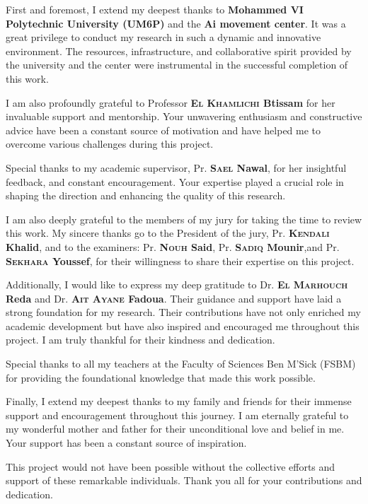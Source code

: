 First and foremost, I extend my deepest thanks to \textbf{Mohammed VI Polytechnic University (UM6P)} and the \textbf{Ai movement center}. It was a great privilege to conduct my research in such a dynamic and innovative environment. The resources, infrastructure, and collaborative spirit provided by the university and the center were instrumental in the successful completion of this work.
\medskip

I am also profoundly grateful to Professor \textbf{\textsc{ El Khamlichi} Btissam } for her invaluable support and mentorship. Your unwavering enthusiasm and constructive advice have been a constant source of motivation and have helped me to overcome various challenges during this project.
\medskip

Special thanks to my academic supervisor, Pr. \textbf{\textsc{Sael} Nawal}, for her insightful feedback, and constant encouragement. Your expertise played a crucial role in shaping the direction and enhancing the quality of this research.
\medskip

I am also deeply grateful to the members of my jury for taking the time to review this work. My sincere thanks go to the President of the jury, Pr. \textbf{\textsc{Kendali} Khalid}, and to the examiners: Pr. \textbf{\textsc{Nouh} Said}, Pr. \textbf{\textsc{Sadiq} Mounir},and  Pr. \textbf{\textsc{Sekhara} Youssef}, for their willingness to share their expertise on this project.
\medskip

Additionally, I would like to express my deep gratitude to Dr. \textbf{\textsc{El Marhouch} Reda } and Dr. \textbf{\textsc{Ait Ayane} Fadoua}. Their guidance and support have laid a strong foundation for my research. Their contributions have not only enriched my academic development but have also inspired and encouraged me throughout this project. I am truly thankful for their kindness and dedication.
\medskip



Special thanks to all my teachers at the Faculty of Sciences Ben M'Sick (FSBM) for providing the foundational knowledge that made this work possible.
\medskip


Finally, I extend my deepest thanks to my family and friends for their immense support and encouragement throughout this journey. I am eternally grateful to my wonderful mother and father for their unconditional love and belief in me. Your support has been a constant source of inspiration.
\medskip


This project would not have been possible without the collective efforts and support of these remarkable individuals. Thank you all for your contributions and dedication.

\clearpage